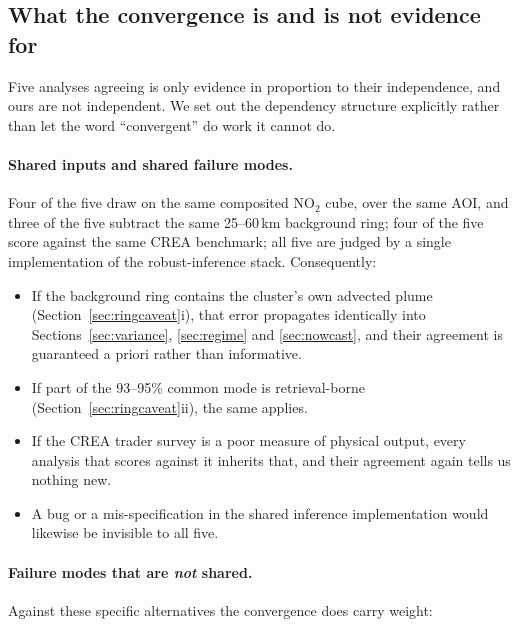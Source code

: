 \documentclass[11pt,a4paper]{article}
\providecommand{\ce}[1]{\ensuremath{\mathrm{#1}}}
\begin{document}
\subsection{What the convergence is and is not evidence for}
\label{sec:shared}

Five analyses agreeing is only evidence in proportion to their independence, and ours are not
independent. We set out the dependency structure explicitly rather than let the word
``convergent'' do work it cannot do.

\paragraph{Shared inputs and shared failure modes.} Four of the five draw on the same composited
\ce{NO_2} cube, over the same AOI, and three of the five subtract the same 25--60\,km background
ring; four of the five score against the same CREA benchmark; all five are judged by a single
implementation of the robust-inference stack. Consequently:

\begin{itemize}[leftmargin=1.4em,itemsep=0.2em]
  \item If the background ring contains the cluster's own advected plume
  (Section~\ref{sec:ringcaveat}i), that error propagates identically into
  Sections~\ref{sec:variance}, \ref{sec:regime} and \ref{sec:nowcast}, and their agreement is
  guaranteed a priori rather than informative.
  \item If part of the 93--95\% common mode is retrieval-borne
  (Section~\ref{sec:ringcaveat}ii), the same applies.
  \item If the CREA trader survey is a poor measure of physical output, every analysis that
  scores against it inherits that, and their agreement again tells us nothing new.
  \item A bug or a mis-specification in the shared inference implementation would likewise be
  invisible to all five.
\end{itemize}

\paragraph{Failure modes that are \emph{not} shared.} Against these specific alternatives the
convergence does carry weight:
\end{document}
